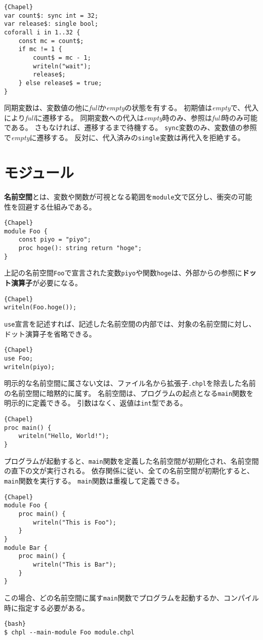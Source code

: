 \documentclass[10pt,a4paper]{book}
\begin{document}
\begin{Verbatim}{Chapel}
var count$: sync int = 32;
var release$: single bool;
coforall i in 1..32 {
	const mc = count$;
	if mc != 1 {
		count$ = mc - 1;
		writeln("wait");
		release$;
	} else release$ = true;
}
\end{Verbatim}

同期変数は、変数値の他に\textit{full}か\textit{empty}の状態を有する。
初期値は\textit{empty}で、代入により\textit{full}に遷移する。
同期変数への代入は\textit{empty}時のみ、参照は\textit{full}時のみ可能である。
さもなければ、遷移するまで待機する。
\verb#sync#変数のみ、変数値の参照で\textit{empty}に遷移する。
反対に、代入済みの\verb#single#変数は再代入を拒絶する。

\chapter{モジュール}

\textbf{名前空間}とは、変数や関数が可視となる範囲を\verb#module#文で区分し、衝突の可能性を回避する仕組みである。

\begin{Verbatim}{Chapel}
module Foo {
	const piyo = "piyo";
	proc hoge(): string return "hoge";
}
\end{Verbatim}

上記の名前空間\verb#Foo#で宣言された変数\verb#piyo#や関数\verb#hoge#は、外部からの参照に\textbf{ドット演算子}が必要になる。

\begin{Verbatim}{Chapel}
writeln(Foo.hoge());
\end{Verbatim}

\verb#use#宣言を記述すれば、記述した名前空間の内部では、対象の名前空間に対し、ドット演算子を省略できる。

\begin{Verbatim}{Chapel}
use Foo;
writeln(piyo);
\end{Verbatim}

明示的な名前空間に属さない文は、ファイル名から拡張子\verb#.chpl#を除去した名前の名前空間に暗黙的に属す。
名前空間は、プログラムの起点となる\verb#main#関数を明示的に定義できる。
引数はなく、返値は\verb#int#型である。

\begin{Verbatim}{Chapel}
proc main() {
	writeln("Hello, World!");
}
\end{Verbatim}

プログラムが起動すると、\verb#main#関数を定義した名前空間が初期化され、名前空間の直下の文が実行される。
依存関係に従い、全ての名前空間が初期化すると、\verb#main#関数を実行する。
\verb#main#関数は重複して定義できる。

\begin{Verbatim}{Chapel}
module Foo {
	proc main() {
		writeln("This is Foo");
	}
}
module Bar {
	proc main() {
		writeln("This is Bar");
	}
}
\end{Verbatim}

この場合、どの名前空間に属す\verb#main#関数でプログラムを起動するか、コンパイル時に指定する必要がある。

\begin{Verbatim}{bash}
$ chpl --main-module Foo module.chpl
\end{Verbatim}
\end{document}
